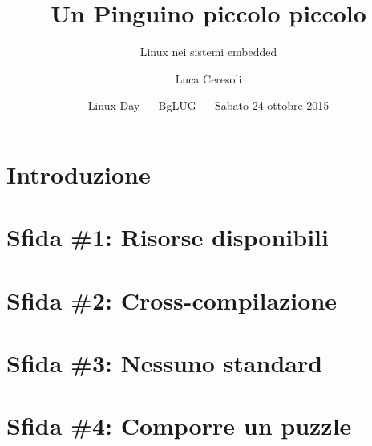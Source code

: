 \documentclass[xetex]{beamer}
\title{Un Pinguino piccolo piccolo}
\subtitle{Linux nei sistemi embedded}
\author{Luca Ceresoli}
\date{Linux Day --- BgLUG --- Sabato 24 ottobre 2015}
\begin{document}
\maketitle

\section{Introduzione}

\section{Sfida \#1: Risorse disponibili}

\section{Sfida \#2: Cross-compilazione}

\section{Sfida \#3: Nessuno standard}

\section{Sfida \#4: Comporre un puzzle}
\end{document}
